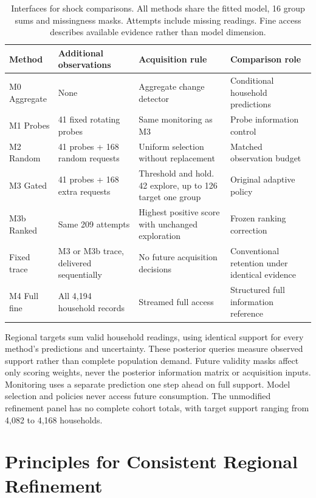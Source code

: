 \documentclass[conference]{IEEEtran}
\begin{document}
\begin{table}[!t]
\caption{Interfaces for shock comparisons. All methods share the fitted model, 16 group sums and missingness masks. Attempts include missing readings. Fine access describes available evidence rather than model dimension.}
\label{tab:methods}\centering
\begin{tabular}{p{}p{}p{}p{}}
\toprule
Method & Additional observations & Acquisition rule & Comparison role\\
\midrule
M0 Aggregate & None & Aggregate change detector & Conditional household predictions\\
M1 Probes & 41 fixed rotating probes & Same monitoring as M3 & Probe information control\\
M2 Random & 41 probes + 168 random requests & Uniform selection without replacement & Matched observation budget\\
M3 Gated & 41 probes + 168 extra requests & Threshold and hold. 42 explore, up to 126 target one group & Original adaptive policy\\
M3b Ranked & Same 209 attempts & Highest positive score with unchanged exploration & Frozen ranking correction\\
Fixed trace & M3 or M3b trace, delivered sequentially & No future acquisition decisions & Conventional retention under identical evidence\\
M4 Full fine & All 4,194 household records & Streamed full access & Structured full information reference\\
\bottomrule
\end{tabular}
\end{table}

Regional targets sum valid household readings, using identical support for every method's predictions and uncertainty. These posterior queries measure observed support rather than complete population demand. Future validity masks affect only scoring weights, never the posterior information matrix or acquisition inputs. Monitoring uses a separate prediction one step ahead on full support. Model selection and policies never access future consumption. The unmodified refinement panel has no complete cohort totals, with target support ranging from 4,082 to 4,168 households.








\section{Principles for Consistent Regional Refinement}
\end{document}

